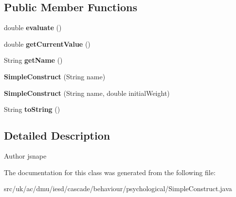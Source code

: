 \subsection*{Public Member Functions}
\begin{DoxyCompactItemize}
\item 
\hypertarget{classuk_1_1ac_1_1dmu_1_1iesd_1_1cascade_1_1behaviour_1_1psychological_1_1_simple_construct_a3ec0df84f56bfbb2b419af57c676ce7e}{double {\bfseries evaluate} ()}\label{classuk_1_1ac_1_1dmu_1_1iesd_1_1cascade_1_1behaviour_1_1psychological_1_1_simple_construct_a3ec0df84f56bfbb2b419af57c676ce7e}

\item 
\hypertarget{classuk_1_1ac_1_1dmu_1_1iesd_1_1cascade_1_1behaviour_1_1psychological_1_1_simple_construct_a843caaeb5f1c30080f4b903e0efeb181}{double {\bfseries get\-Current\-Value} ()}\label{classuk_1_1ac_1_1dmu_1_1iesd_1_1cascade_1_1behaviour_1_1psychological_1_1_simple_construct_a843caaeb5f1c30080f4b903e0efeb181}

\item 
\hypertarget{classuk_1_1ac_1_1dmu_1_1iesd_1_1cascade_1_1behaviour_1_1psychological_1_1_simple_construct_ad6f5bd541a4fbab6a9730daa1f130cac}{String {\bfseries get\-Name} ()}\label{classuk_1_1ac_1_1dmu_1_1iesd_1_1cascade_1_1behaviour_1_1psychological_1_1_simple_construct_ad6f5bd541a4fbab6a9730daa1f130cac}

\item 
\hypertarget{classuk_1_1ac_1_1dmu_1_1iesd_1_1cascade_1_1behaviour_1_1psychological_1_1_simple_construct_abb2dc04fabce8e8617231a2c69bb1e3d}{{\bfseries Simple\-Construct} (String name)}\label{classuk_1_1ac_1_1dmu_1_1iesd_1_1cascade_1_1behaviour_1_1psychological_1_1_simple_construct_abb2dc04fabce8e8617231a2c69bb1e3d}

\item 
\hypertarget{classuk_1_1ac_1_1dmu_1_1iesd_1_1cascade_1_1behaviour_1_1psychological_1_1_simple_construct_ab11c0dd9ec942d6817828a1dab492567}{{\bfseries Simple\-Construct} (String name, double initial\-Weight)}\label{classuk_1_1ac_1_1dmu_1_1iesd_1_1cascade_1_1behaviour_1_1psychological_1_1_simple_construct_ab11c0dd9ec942d6817828a1dab492567}

\item 
\hypertarget{classuk_1_1ac_1_1dmu_1_1iesd_1_1cascade_1_1behaviour_1_1psychological_1_1_simple_construct_af07d8ec3d285c74461f68a4d22beb555}{String {\bfseries to\-String} ()}\label{classuk_1_1ac_1_1dmu_1_1iesd_1_1cascade_1_1behaviour_1_1psychological_1_1_simple_construct_af07d8ec3d285c74461f68a4d22beb555}

\end{DoxyCompactItemize}


\subsection{Detailed Description}
\begin{DoxyAuthor}{Author}
jsnape 
\end{DoxyAuthor}


The documentation for this class was generated from the following file\-:\begin{DoxyCompactItemize}
\item 
src/uk/ac/dmu/iesd/cascade/behaviour/psychological/Simple\-Construct.\-java\end{DoxyCompactItemize}
